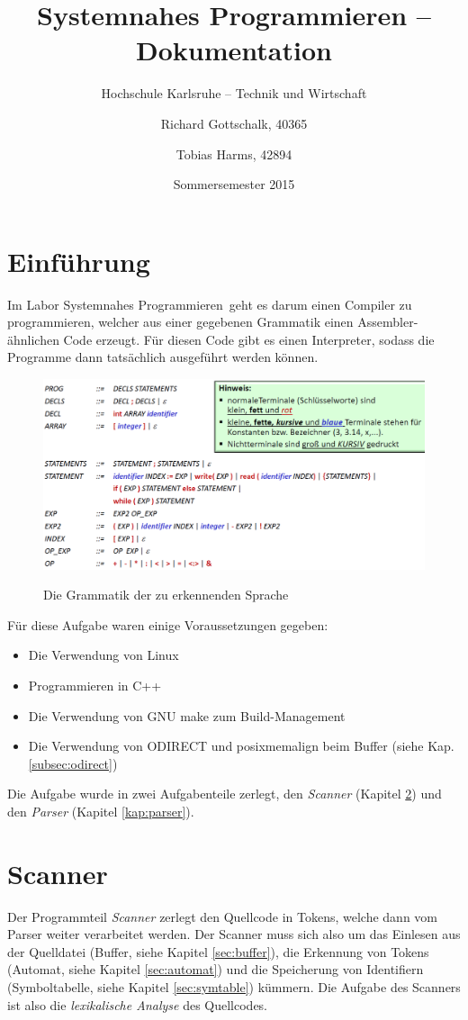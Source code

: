 \documentclass[listof=totoc,DIV11,a4paper]{scrreprt}
\title{Systemnahes Programmieren -- Dokumentation}
\subtitle{Hochschule Karlsruhe -- Technik und Wirtschaft}
\author{Richard Gottschalk, 40365 \and Tobias Harms, 42894}
\date{Sommersemester 2015}
\newcommand{\od}{O\textunderscore DIRECT }
\begin{document}
\begin{singlespace}
\maketitle
\tableofcontents
\listoffigures
\lstlistoflistings
\end{singlespace}
\chapter{Einführung}
Im Labor \glqq Systemnahes Programmieren\grqq\ geht es darum einen Compiler zu programmieren, welcher aus einer gegebenen Grammatik einen Assembler-ähnlichen Code erzeugt. Für diesen Code gibt es einen Interpreter, sodass die Programme dann tatsächlich ausgeführt werden können.

\begin{figure}[h]
\includegraphics[width=\linewidth]{images/grammatik}
\label{img:grammatik}
\caption{Die Grammatik der zu erkennenden Sprache}
\end{figure}

Für diese Aufgabe waren einige Voraussetzungen gegeben:
\begin{itemize}
\item Die Verwendung von Linux
\item Programmieren in C++
\item Die Verwendung von GNU make zum Build-Management
\item Die Verwendung von \od und posix\textunderscore memalign beim Buffer (siehe Kap. \ref{subsec:odirect}) 
\end{itemize}

Die Aufgabe wurde in zwei Aufgabenteile zerlegt, den \emph{Scanner} (Kapitel \ref{kap:scanner}) und den \emph{Parser} (Kapitel \ref{kap:parser}).

\chapter{Scanner}\label{kap:scanner}
Der Programmteil \emph{Scanner} zerlegt den Quellcode in Tokens, welche dann vom Parser weiter verarbeitet werden. Der Scanner muss sich also um das Einlesen aus der Quelldatei (Buffer, siehe Kapitel \ref{sec:buffer}), die Erkennung von Tokens (Automat, siehe Kapitel \ref{sec:automat}) und die Speicherung von Identifiern (Symboltabelle, siehe Kapitel \ref{sec:symtable}) kümmern. Die Aufgabe des Scanners ist also die \emph{lexikalische Analyse} des Quellcodes.
\end{document}
